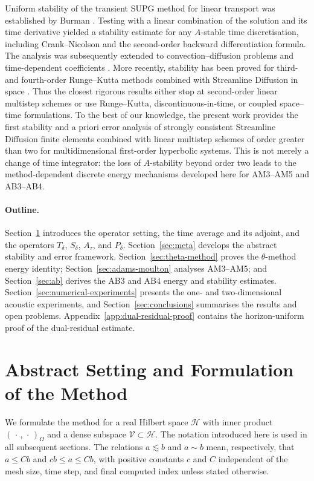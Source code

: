 \documentclass[11pt]{article}
\begin{document}
Uniform stability of the transient SUPG method for linear transport was
established by Burman \cite{Bu10}. Testing with a linear combination of the
solution and its time derivative yielded a stability estimate for any
\(A\)-stable time discretisation, including Crank--Nicolson and the
second-order backward differentiation formula. The analysis was subsequently extended to
convection--diffusion problems \cite{BS11} and time-dependent coefficients
\cite{ZL22}. More recently, stability has been proved for third- and
fourth-order Runge--Kutta methods combined with Streamline Diffusion in space
\cite{EG25}.
Thus the closest rigorous results either stop at second-order linear
multistep schemes or use Runge--Kutta, discontinuous-in-time, or coupled
space--time formulations. To the best of our knowledge, the present work
provides the first stability and a priori error analysis of strongly
consistent Streamline Diffusion finite elements combined with linear
multistep schemes of order greater than two for multidimensional first-order
hyperbolic systems. This is not merely a change of time integrator: the loss
of \(A\)-stability beyond order two leads to the method-dependent discrete
energy mechanisms developed here for AM3--AM5 and AB3--AB4.

\paragraph{Outline.}
Section~\ref{sec:abstract-method} introduces the operator setting, the time
average and its adjoint, and the operators \(T_{\delta}\), \(S_{\delta}\),
\(A_{\tau}\), and \(P_{\delta}\). Section~\ref{sec:meta} develops the
abstract stability and error framework. Section~\ref{sec:theta-method} proves
the \(\theta\)-method energy identity; Section~\ref{sec:adams-moulton} analyses AM3--AM5;
and Section~\ref{sec:ab} derives the AB3 and AB4 energy and stability
estimates. Section~\ref{sec:numerical-experiments} presents the one- and
two-dimensional acoustic experiments, and Section~\ref{sec:conclusions}
summarises the results and open problems. Appendix~\ref{app:dual-residual-proof}
contains the horizon-uniform proof of the dual-residual estimate.


\section{Abstract Setting and Formulation of the Method}
\label{sec:abstract-method}
We formulate the method for a real Hilbert space \(\mathcal H\) with inner
product \((\,\cdot\,,\,\cdot\,)_{\Omega}\) and a dense subspace
\(\mathcal V\subset\mathcal H\). The notation introduced here is used in all
subsequent sections. The relations \(a\lesssim b\) and \(a\sim b\) mean,
respectively, that \(a\le Cb\) and \(c b\le a\le Cb\), with positive
constants \(c\) and \(C\) independent of the mesh size, time step, and final
computed index unless stated otherwise.
\end{document}
